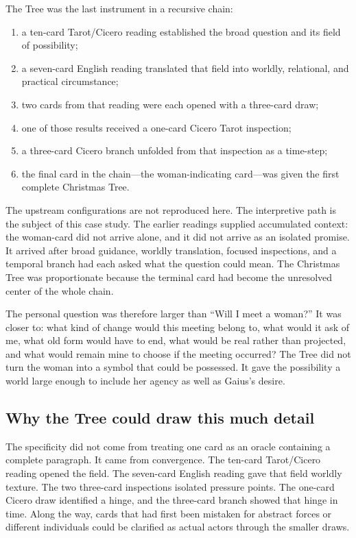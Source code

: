The Tree was the last instrument in a recursive chain:

\begin{enumerate}
\item a ten-card Tarot/Cicero reading established the broad question and its
      field of possibility;
\item a seven-card English reading translated that field into worldly,
      relational, and practical circumstance;
\item two cards from that reading were each opened with a three-card draw;
\item one of those results received a one-card Cicero Tarot inspection;
\item a three-card Cicero branch unfolded from that inspection as a time-step;
\item the final card in the chain—the woman-indicating card—was given the first
      complete Christmas Tree.
\end{enumerate}

The upstream configurations are not reproduced here. The interpretive path is
the subject of this case study. The earlier readings supplied accumulated
context: the woman-card did not arrive alone, and it did not arrive as an
isolated promise. It arrived after broad guidance, worldly translation,
focused inspections, and a temporal branch had each asked what the question
could mean. The Christmas Tree was proportionate because the terminal card had
become the unresolved center of the whole chain.

The personal question was therefore larger than ``Will I meet a woman?'' It was
closer to: what kind of change would this meeting belong to, what would it ask
of me, what old form would have to end, what would be real rather than projected,
and what would remain mine to choose if the meeting occurred? The Tree did not
turn the woman into a symbol that could be possessed. It gave the possibility a
world large enough to include her agency as well as Gaius's desire.

\subsection{Why the Tree could draw this much detail}

The specificity did not come from treating one card as an oracle containing a
complete paragraph. It came from convergence. The ten-card Tarot/Cicero reading
opened the field. The seven-card English reading gave that field worldly
texture. The two three-card inspections isolated pressure points. The one-card
Cicero draw identified a hinge, and the three-card branch showed that hinge in
time. Along the way, cards that had first been mistaken for abstract forces or
different individuals could be clarified as actual actors through the smaller
draws.

